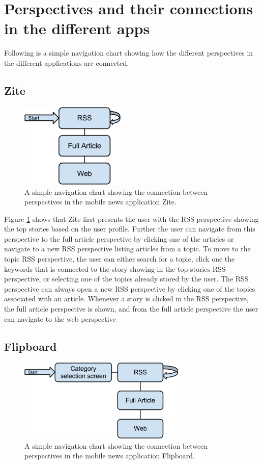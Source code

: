 \section{Perspectives and their connections in the different apps}
Following is a simple navigation chart showing how the different perspectives in the different applications are connected.

\subsection{Zite}

\begin{figure}[!htbp]
\centering
\includegraphics[width=50mm]{GFX/statecharts/Zite.png}
\caption{A simple navigation chart showing the connection between perspectives in the mobile news application Zite.}
\label{state_chart_zite}
\end{figure}

Figure \ref{state_chart_zite} shows that Zite first presents the user with the RSS perspective showing the top stories based on the user profile. Further the user can navigate from this perspective to the full article perspective by clicking one of the articles or navigate to a new RSS perspective listing articles from a topic. To move to the topic RSS perspective, the user can either search for a topic, click one the keywords that is connected to the story showing in the top stories RSS perspective, or selecting one of the topics already stored by the user. The RSS perspective can always open a new RSS perspective by clicking one of the topics associated with an article. Whenever a story is clicked in the RSS perspective, the full article perspective is shown, and from the full article perspective the user can navigate to the web perspective

\subsection{Flipboard}

\begin{figure}[!htbp]
\centering
\includegraphics[width=80mm]{GFX/statecharts/Flipboard.png}
\caption{A simple navigation chart showing the connection between perspectives in the mobile news application Flipboard.}
\label{state_chart_flipboard}
\end{figure}

